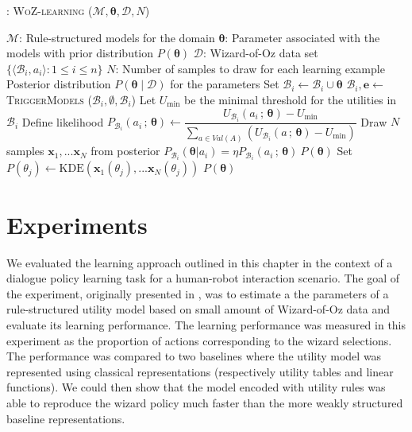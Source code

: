 \begin{algorithm}[h!]
\caption{: \textsc{WoZ-learning} ($\mathcal{M}, \boldsymbol\theta, \mathcal{D}, N$)}
\begin{algorithmic}[1] \vspace{1mm}
\REQUIRE $\mathcal{M}$: Rule-structured models for the domain
\REQUIRE $\boldsymbol\theta$: Parameter associated with the models with prior distribution $P(\boldsymbol\theta)$
\REQUIRE $\mathcal{D}$: Wizard-of-Oz data set $\{\langle \mathcal{B}_i, a_i \rangle : 1 \leq i  \leq n\}$
\REQUIRE $N$: Number of samples to draw for each learning example
\ENSURE Posterior distribution $P(\boldsymbol\theta \; | \; \mathcal{D})$ for the parameters  \vspace{1mm}
\STATE Set $\mathcal{B}_i \leftarrow \mathcal{B}_i \cup \boldsymbol\theta$
\STATE $\mathcal{B}_i, \mathbf{e} \leftarrow$ \textsc{TriggerModels} ($\mathcal{B}_i, \emptyset,  \mathcal{B}_i$) 
\STATE Let $U_{\mathrm{min}}$ be the minimal threshold for the utilities in $\mathcal{B}_i$ \vspace{2mm} 
\STATE Define likelihood  $P_{\mathcal{B}_i}(a_i \, ; \, \boldsymbol\theta) \leftarrow \dfrac{U_{\mathcal{B}_i}(a_i \, ; \, \boldsymbol\theta) - U_{\mathrm{min}}}{\sum_{a \in Val(A)} (U_{\mathcal{B}_i}(a  \, ; \, \boldsymbol\theta) - U_{\mathrm{min}})} $ \vspace{2mm} 
\STATE Draw $N$ samples $\mathbf{x}_1,...\mathbf{x}_N$ from posterior $P_{\mathcal{B}_i}(\boldsymbol\theta | a_i) = \eta P_{\mathcal{B}_i}(a_i \, ; \, \boldsymbol\theta) \ P(\boldsymbol\theta )$
\STATE Set $P(\theta_j) \leftarrow \mathrm{KDE}(\mathbf{x}_1(\theta_j),...\mathbf{x}_N(\theta_j))$
\ENDFOR
\ENDFOR
\RETURN $P(\boldsymbol\theta)$
\end{algorithmic}
\label{algo:wozlearning}
\end{algorithm}


\section{Experiments}
\label{sec:wozlearning-experiments}

We evaluated the learning approach outlined in this chapter in the context of a dialogue policy learning task for a human-robot interaction scenario.  The goal of the experiment, originally presented in \cite{rulebasedmodels-sigdial2012}, was to estimate a the parameters of a rule-structured utility model based on small amount of Wizard-of-Oz data and evaluate its learning performance.  The learning performance was measured in this experiment as the proportion of actions corresponding to the wizard selections. The performance was compared to two baselines where the utility model was represented using classical representations (respectively utility tables and linear functions). We could then show that the model encoded with utility rules was able to reproduce the wizard policy much faster than the more weakly structured baseline representations. 

